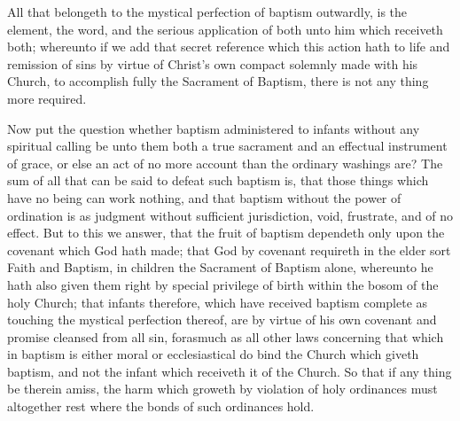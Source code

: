 All that belongeth to the mystical perfection of baptism outwardly, is the element, the word, and the serious application of both unto him which receiveth both; whereunto if we add that secret reference which this action hath to life and remission of sins by virtue of Christ’s own compact solemnly made with his Church, to accomplish fully the Sacrament of Baptism, there is not any thing more required.

Now put the question whether baptism administered to infants without any spiritual calling be unto them both a true sacrament and an effectual instrument of grace, or else an act of no more account than the ordinary washings are? The sum of all that can be said to defeat such baptism is, that those things which have no being can work nothing, and that baptism without the power of ordination is as judgment without sufficient jurisdiction, void, frustrate, and of no effect. But to this we answer, that the fruit of baptism dependeth  only upon the covenant which God hath made;
 that God by covenant requireth in the elder sort Faith and Baptism, in children the Sacrament of Baptism alone, whereunto he hath also given them right by special privilege of birth within the bosom of the holy Church; that infants therefore, which have received baptism complete as touching the mystical perfection thereof, are by virtue of his own covenant and promise cleansed from all sin, forasmuch as all other laws concerning that which in baptism is either moral or ecclesiastical do bind the Church which giveth baptism, and not the infant which receiveth it of the Church. So that if any thing be therein amiss, the harm which groweth by violation of holy ordinances must altogether rest where the bonds of such ordinances hold.

